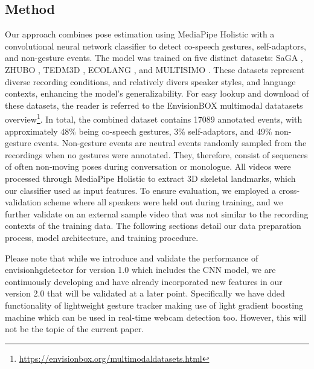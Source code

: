 \documentclass[11pt,headings=small,cleardoublepage=empty,tocflat,numbers=noenddot,twoside,captions=tableheading]{scrbook}
\begin{document}
\begin{refsection}
\section{Method}
\label{sec:methodology}
Our approach combines pose estimation using MediaPipe Holistic with a convolutional neural network classifier to detect co-speech gestures, self-adaptors, and non-gesture events. The model was trained on five distinct datasets: SaGA \parencite{luckingBielefeldSpeechGesture2010}, ZHUBO \parencite{baoEditableCoSpeechGesture2024}, TEDM3D \parencite{rohrerTemporalPragmaticAnalysis2022}, ECOLANG \parencite{guECOLANGMultimodalCorpus2025}, and MULTISIMO \parencite{koutsombogeraModelingCollaborativeMultimodal2018}. These datasets represent diverse recording conditions, and relatively divers speaker styles, and language contexts, enhancing the model's generalizability. For easy lookup and download of these datasets, the reader is referred to the EnvisionBOX multimodal datatasets overview\footnote{\url{https://envisionbox.org/multimodaldatasets.html}}. In total, the combined dataset contains 17089 annotated events, with approximately 48\% being co-speech gestures, 3\% self-adaptors, and 49\% non-gesture events. Non-gesture events are neutral events randomly sampled from the recordings when no gestures were annotated. They, therefore, consist of sequences of often non-moving poses during conversation or monologue. All videos were processed through MediaPipe Holistic to extract 3D skeletal landmarks, which our classifier used as input features. To ensure evaluation, we employed a cross-validation scheme where all speakers were held out during training, and we further validate on an external sample video that was not similar to the recording contexts of the training data. The following sections detail our data preparation process, model architecture, and training procedure.

Please note that while we introduce and validate the performance of envisionhgdetector for version 1.0 which includes the CNN model, we are continuously developing and have already incorporated new features in our version 2.0 that will be validated at a later point. Specifically we have dded functionality of lightweight gesture tracker making use of light gradient boosting machine which can be used in real-time webcam detection too. However, this will not be the topic of the current paper.


\end{refsection}
\end{document}
